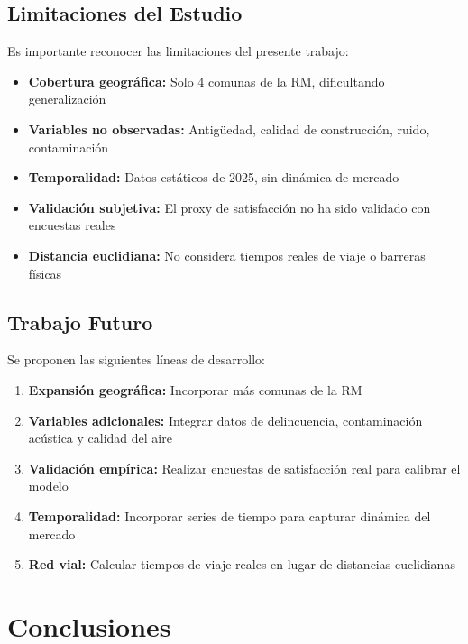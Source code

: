 \documentclass[11pt,letterpaper]{article}
\begin{document}
\subsection{Limitaciones del Estudio}

Es importante reconocer las limitaciones del presente trabajo:

\begin{itemize}
    \item \textbf{Cobertura geográfica:} Solo 4 comunas de la RM, dificultando generalización
    \item \textbf{Variables no observadas:} Antigüedad, calidad de construcción, ruido, contaminación
    \item \textbf{Temporalidad:} Datos estáticos de 2025, sin dinámica de mercado
    \item \textbf{Validación subjetiva:} El proxy de satisfacción no ha sido validado con encuestas reales
    \item \textbf{Distancia euclidiana:} No considera tiempos reales de viaje o barreras físicas
\end{itemize}

\subsection{Trabajo Futuro}

Se proponen las siguientes líneas de desarrollo:

\begin{enumerate}
    \item \textbf{Expansión geográfica:} Incorporar más comunas de la RM
    \item \textbf{Variables adicionales:} Integrar datos de delincuencia, contaminación acústica y calidad del aire
    \item \textbf{Validación empírica:} Realizar encuestas de satisfacción real para calibrar el modelo
    \item \textbf{Temporalidad:} Incorporar series de tiempo para capturar dinámica del mercado
    \item \textbf{Red vial:} Calcular tiempos de viaje reales en lugar de distancias euclidianas
\end{enumerate}

\newpage
\section{Conclusiones}
\end{document}
